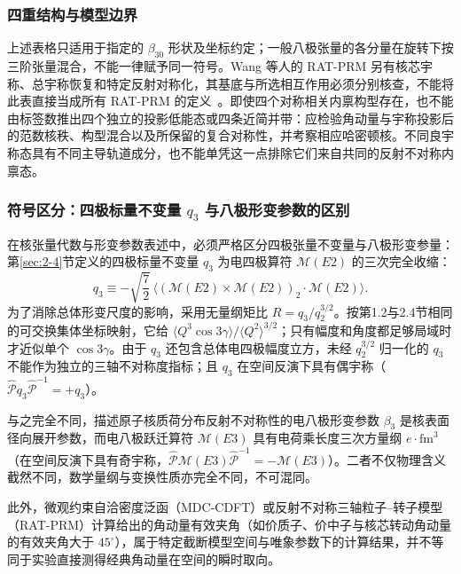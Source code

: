 \subsubsection{四重结构与模型边界}

上述表格只适用于指定的 $\beta_{30}$ 形状及坐标约定；一般八极张量的各分量在旋转下按三阶张量混合，不能一律赋予同一符号。Wang 等人的 RAT-PRM 另有核芯宇称、总宇称恢复和特定反射对称化，其基底与所选相互作用必须分别核查，不能将此表直接当成所有 RAT-PRM 的定义~\cite{wang-2019-rat-prm-78br-octupole-correlations}。即使四个对称相关内禀构型存在，也不能由标签数推出四个独立的投影低能态或四条近简并带：应检验角动量与宇称投影后的范数核秩、构型混合以及所保留的复合对称性，并考察相应哈密顿核。不同良宇称态具有不同主导轨道成分，也不能单凭这一点排除它们来自共同的反射不对称内禀态。

\subsubsection{符号区分：四极标量不变量 $q_3$ 与八极形变参数的区别}

在核张量代数与形变参数表述中，必须严格区分四极张量不变量与八极形变参量：
第\ref{sec:2-4}节定义的四极标量不变量 $q_3$ 为电四极算符 $\mathcal{M}(E2)$ 的三次完全收缩：
\begin{equation}\label{eq:4-5-q3-def}
q_3 \equiv -\sqrt{\frac{7}{2}}\,\langle (\mathcal{M}(E2) \times \mathcal{M}(E2))_2 \cdot \mathcal{M}(E2) \rangle .
\end{equation}
为了消除总体形变尺度的影响，采用无量纲矩比 $R=q_3/q_2^{3/2}$。按第1.2与2.4节相同的可交换集体坐标映射，它给 $\langle Q^3\cos3\gamma\rangle/\langle Q^2\rangle^{3/2}$；只有幅度和角度都足够局域时才近似单个 $\cos3\gamma$。由于 $q_3$ 还包含总体电四极幅度立方，未经 $q_2^{3/2}$ 归一化的 $q_3$ 不能作为独立的三轴不对称度指标；且 $q_3$ 在空间反演下具有偶宇称（$\hat{\mathcal{P}} q_3 \hat{\mathcal{P}}^{-1} = +q_3$）。

与之完全不同，描述原子核质荷分布反射不对称性的电八极形变参数 $\beta_3$ 是核表面径向展开参数，而电八极跃迁算符 $\mathcal{M}(E3)$ 具有电荷乘长度三次方量纲 $e\cdot\mathrm{fm}^3$（在空间反演下具有奇宇称，$\hat{\mathcal{P}} \mathcal{M}(E3) \hat{\mathcal{P}}^{-1} = -\mathcal{M}(E3)$）。二者不仅物理含义截然不同，数学量纲与变换性质亦完全不同，不可混同。

此外，微观约束自洽密度泛函（MDC-CDFT）或反射不对称三轴粒子--转子模型（RAT-PRM）计算给出的角动量有效夹角（如价质子、价中子与核芯转动角动量的有效夹角大于 $45^\circ$），属于特定截断模型空间与唯象参数下的计算结果，并不等同于实验直接测得经典角动量在空间的瞬时取向。


